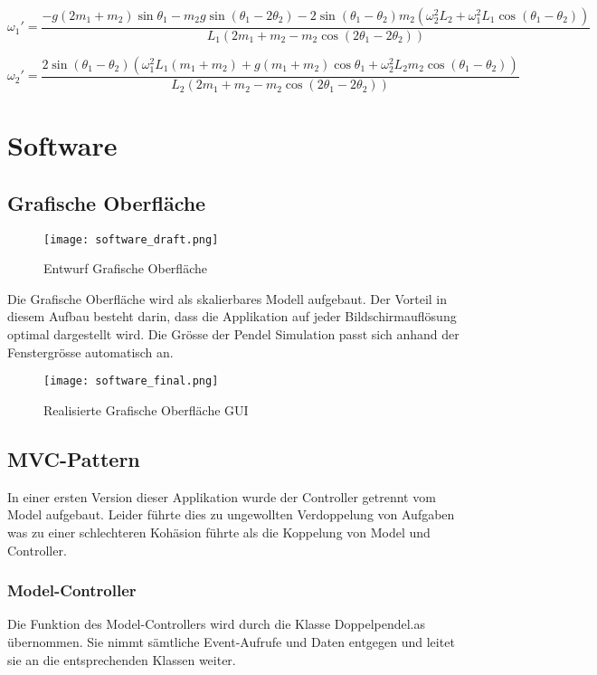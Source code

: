 \documentclass[12pt]{article}
\numberwithin{equation}{subsection}
\begin{document}
\begin{equation} \label{eq:rk:3}
	\omega_1' = \frac{-g(2m_1+m_2)\sin\theta_1 - m_2 g \sin(\theta_1 - 2\theta_2) -2\sin(\theta_1 - \theta_2)m_2(\omega_2^2 L_2 + \omega_1^2 L_1\cos(\theta_1 - \theta_2))}
	{L_1(2m_1 + m_2 - m_2 \cos(2\theta_1 - 2\theta_2))}
\end{equation}

\begin{equation} \label{eq:rk:4}
	\omega_2' = \frac{2\sin(\theta_1 - \theta_2)(\omega_1^2 L_1(m_1 + m_2) + g(m_1 + m_2)\cos\theta_1 + \omega_2^2 L_2 m_2 \cos(\theta_1 - \theta_2))}
	{L_2 (2m_1 + m_2 - m_2 \cos(2 \theta_1 - 2\theta_2))}
\end{equation}

\newpage
\section{Software}
\subsection{Grafische Oberfläche}

\begin{figure}[H]
	\centering
	\texttt{[image: software\_draft.png]}
	\caption{Entwurf Grafische Oberfläche}
	\label{fig:gui:draft}
\end{figure}

Die Grafische Oberfläche wird als skalierbares Modell aufgebaut. Der Vorteil in diesem Aufbau besteht darin, dass die Applikation auf jeder Bildschirmauflösung optimal dargestellt wird. Die Grösse der Pendel Simulation passt sich anhand der Fenstergrösse automatisch an.

\begin{figure}[H]
	\centering
	\texttt{[image: software\_final.png]}
	\caption{Realisierte Grafische Oberfläche GUI}
	\label{fig:xml}
\end{figure}

\subsection{MVC-Pattern}
In einer ersten Version dieser Applikation wurde der Controller getrennt vom Model aufgebaut. Leider führte dies zu ungewollten Verdoppelung von Aufgaben was zu einer schlechteren Kohäsion führte als die Koppelung von Model und Controller.

\subsubsection{Model-Controller}
Die Funktion des Model-Controllers wird durch die Klasse Doppelpendel.as übernommen. Sie nimmt sämtliche Event-Aufrufe und Daten entgegen und leitet sie an die entsprechenden Klassen weiter.
\end{document}

